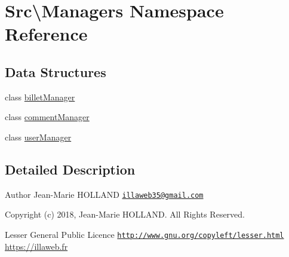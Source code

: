 \hypertarget{namespace_src_1_1_managers}{}\section{Src\textbackslash{}Managers Namespace Reference}
\label{namespace_src_1_1_managers}
\subsection*{Data Structures}
\begin{DoxyCompactItemize}
\item 
class \hyperlink{class_src_1_1_managers_1_1billet_manager}{billet\+Manager}
\item 
class \hyperlink{class_src_1_1_managers_1_1comment_manager}{comment\+Manager}
\item 
class \hyperlink{class_src_1_1_managers_1_1user_manager}{user\+Manager}
\end{DoxyCompactItemize}


\subsection{Detailed Description}
\begin{DoxyAuthor}{Author}
Jean-\/\+Marie H\+O\+L\+L\+A\+ND \href{mailto:illaweb35@gmail.com}{\tt illaweb35@gmail.\+com} 
\end{DoxyAuthor}
\begin{DoxyCopyright}{Copyright}
(c) 2018, Jean-\/\+Marie H\+O\+L\+L\+A\+ND. All Rights Reserved.
\end{DoxyCopyright}
Lesser General Public Licence \href{http://www.gnu.org/copyleft/lesser.html}{\tt http\+://www.\+gnu.\+org/copyleft/lesser.\+html} \hyperlink{}{https\+://illaweb.\+fr}